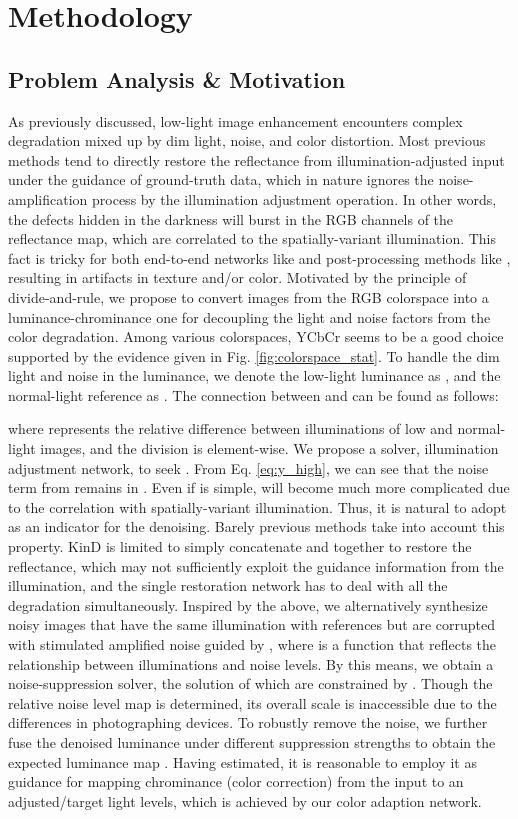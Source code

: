 \documentclass[10pt,twocolumn,letterpaper]{article}
\begin{document}
\section{Methodology}
\subsection{Problem Analysis \& Motivation}
\label{sec:motivation}
As previously discussed, low-light image enhancement encounters complex degradation mixed up by dim light, noise, and color distortion. Most previous methods tend to directly restore the reflectance from illumination-adjusted input under the guidance of ground-truth data, which in nature ignores the noise-amplification process by the illumination adjustment operation. In other words, the defects hidden in the darkness will burst in the RGB channels of the reflectance map, which are correlated to the spatially-variant illumination. This fact is tricky for both end-to-end networks like \cite{wang2018gladnet} and post-processing methods like \cite{shen2017msr}, resulting in artifacts in texture and/or color. Motivated by the principle of divide-and-rule, we propose to convert images from the RGB colorspace into a luminance-chrominance one for decoupling the light and noise factors from the color degradation. Among various colorspaces, YCbCr seems to be a good choice supported by the evidence given in Fig. \ref{fig:colorspace_stat}. To handle the dim light and noise in the luminance, we denote the low-light luminance as , and the normal-light reference as . The connection between  and  can be found as follows:

where  represents the relative difference between illuminations of low and normal-light images, and the division is element-wise. We propose a solver, \ie illumination adjustment network, to seek . From Eq. \eqref{eq:y_high}, we can see that the noise term  from  remains in . Even if  is simple,  will become much more complicated due to the correlation with spatially-variant illumination. Thus, it is natural to adopt  as an indicator for the denoising. Barely previous methods take into account this property. KinD \cite{zhang2019kindling} is limited to simply concatenate  and  together to restore the reflectance, which may not sufficiently exploit the guidance information from the illumination, and the single restoration network has to deal with all the degradation simultaneously. Inspired by the above, we alternatively synthesize noisy images that have the same illumination with references but are corrupted with stimulated amplified noise guided by , where  is a function that reflects the relationship between illuminations and noise levels. By this means, we obtain a noise-suppression solver, the solution of which are constrained by . Though the relative noise level map is determined, its overall scale is inaccessible due to the differences in photographing devices. To robustly remove the noise, we further fuse the denoised luminance  under different suppression strengths to obtain the expected luminance map . Having  estimated, it is reasonable to employ it as guidance for mapping chrominance (color correction) from the input to an adjusted/target light levels, which is achieved by our color adaption network.
\end{document}
